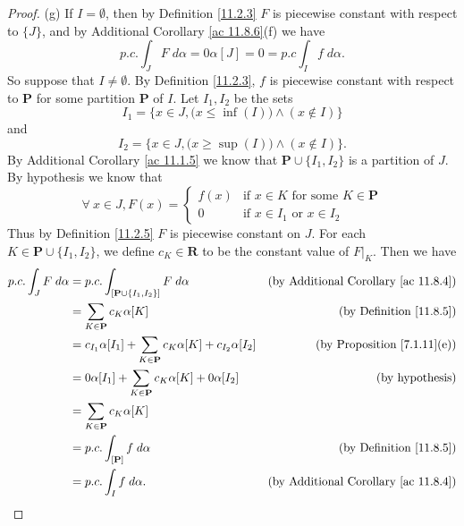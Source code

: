 \begin{proof}{(g)}
    If \(I = \emptyset\), then by Definition \ref{11.2.3} \(F\) is piecewise constant with respect to \(\{J\}\), and by Additional Corollary \ref{ac 11.8.6}(f) we have
    \[
        p.c. \int_J F \; d \alpha = 0 \alpha[J] = 0 = p.c \int_I f \; d \alpha.
    \]
    So suppose that \(I \neq \emptyset\).
    By Definition \ref{11.2.3}, \(f\) is piecewise constant with respect to \(\mathbf{P}\) for some partition \(\mathbf{P}\) of \(I\).
    Let \(I_1, I_2\) be the sets
    \[
        I_1 = \Big\{x \in J, \big(x \leq \inf(I)\big) \land (x \notin I)\Big\}
    \]
    and
    \[
        I_2 = \Big\{x \in J, \big(x \geq \sup(I)\big) \land (x \notin I)\Big\}.
    \]
    By Additional Corollary \ref{ac 11.1.5} we know that \(\mathbf{P} \cup \{I_1, I_2\}\) is a partition of \(J\).
    By hypothesis we know that
    \[
        \forall\ x \in J, F(x) = \begin{cases}
            f(x) & \text{if } x \in K \text{ for some } K \in \mathbf{P} \\
            0    & \text{if } x \in I_1 \text{ or } x \in I_2
        \end{cases}
    \]
    Thus by Definition \ref{11.2.5} \(F\) is piecewise constant on \(J\).
    For each \(K \in \mathbf{P} \cup \{I_1, I_2\}\), we define \(c_K \in \mathbf{R}\) to be the constant value of \(F|_K\).
    Then we have
    \begin{align*}
        p.c. \int_J F \; d \alpha & = p.c. \int_{[\mathbf{P} \cup \{I_1, I_2\}]} F \; d \alpha                          & \text{(by Additional Corollary \ref{ac 11.8.4})} \\
                                  & = \sum_{K \in \mathbf{P}} c_K \alpha[K]                                             & \text{(by Definition \ref{11.8.5})}              \\
                                  & = c_{I_1} \alpha[I_1] + \sum_{K \in \mathbf{P}} c_K \alpha[K] + c_{I_2} \alpha[I_2] & \text{(by Proposition \ref{7.1.11}(e))}          \\
                                  & = 0 \alpha[I_1] + \sum_{K \in \mathbf{P}} c_K \alpha[K] + 0 \alpha[I_2]             & \text{(by hypothesis)}                           \\
                                  & = \sum_{K \in \mathbf{P}} c_K \alpha[K]                                                                                                \\
                                  & = p.c. \int_{[\mathbf{P}]} f \; d \alpha                                            & \text{(by Definition \ref{11.8.5})}              \\
                                  & = p.c. \int_I f \; d \alpha.                                                        & \text{(by Additional Corollary \ref{ac 11.8.4})}
    \end{align*}
\end{proof}

